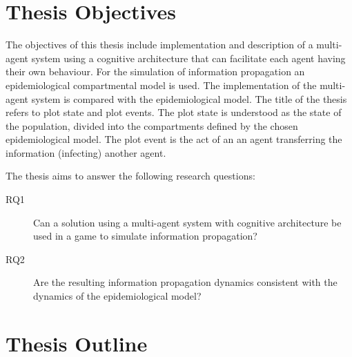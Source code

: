 
\section*{Thesis Objectives}

The objectives of this thesis include implementation and description of a multi-agent system using a cognitive architecture that can facilitate each agent having their own behaviour.
For the simulation of information propagation an epidemiological compartmental model is used.
The implementation of the multi-agent system is compared with the epidemiological model.
The title of the thesis refers to plot state and plot events.
The plot state is understood as the state of the population, divided into the compartments defined by the chosen epidemiological model.
The plot event is the act of an an agent transferring the information (infecting) another agent.

The thesis aims to answer the following research questions:

\begin{description}
    \item[RQ1] Can a solution using a multi-agent system with cognitive architecture be used in a game to simulate information propagation?
    \item[RQ2] Are the resulting information propagation dynamics consistent with the dynamics of the epidemiological model?
\end{description}


\section*{Thesis Outline}

